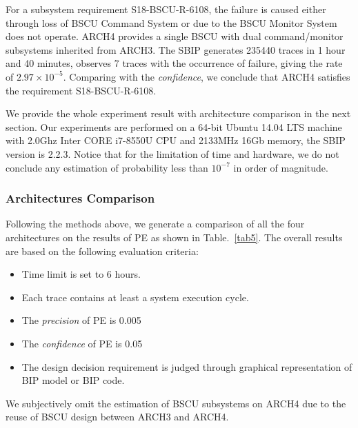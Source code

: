For a subsystem requirement S18-BSCU-R-6108, the failure is caused either through loss of BSCU Command System or due to the BSCU Monitor System does not operate. ARCH4 provides a single BSCU with dual command/monitor subsystems inherited from ARCH3. The SBIP generates 235440 traces in 1 hour and 40 minutes, observes 7 traces with the occurrence of failure, giving the rate of $2.97\times10^{-5}$. Comparing with the \emph{confidence}, we conclude that ARCH4 satisfies the requirement S18-BSCU-R-6108.

We provide the whole experiment result with architecture comparison in the next section. Our experiments are performed on a 64-bit Ubuntu 14.04 LTS machine with 2.0Ghz Inter CORE i7-8550U CPU and 2133MHz 16Gb memory, the SBIP version is 2.2.3. Notice that for the limitation of time and hardware, we do not conclude any estimation of probability less than $10^{-7}$ in order of magnitude.

\subsubsection{Architectures Comparison}
Following the methods above, we generate a comparison of all the four architectures on the results of PE as shown in Table.~\ref{tab5}. The overall results are based on the following evaluation criteria: 

\begin{itemize}
	\item Time limit is set to 6 hours.
	\item Each trace contains at least a system execution cycle.
	\item The \emph{precision} of PE is 0.005
	\item The \emph{confidence} of PE is 0.05
	\item The design decision requirement is judged through graphical representation of BIP model or BIP code.
\end{itemize}

We subjectively omit the estimation of BSCU subsystems on ARCH4 due to the reuse of BSCU design between ARCH3 and ARCH4.

